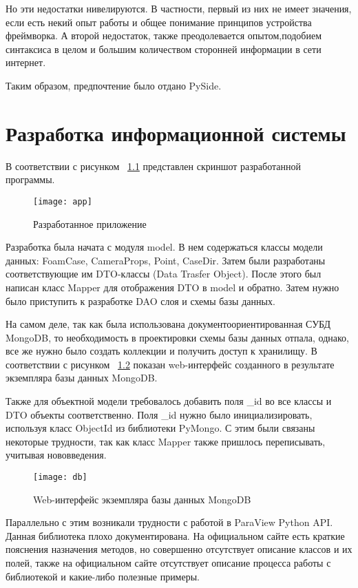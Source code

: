 \documentclass[14pt]{extreport}
\begin{document}
Но эти недостатки нивелируются. В частности, первый из них не имеет значения, если есть некий опыт работы и общее понимание принципов устройства фреймворка. А второй недостаток, также преодолевается опытом,подобием синтаксиса в целом и большим количеством сторонней информации в сети интернет.

Таким образом, предпочтение было отдано PySide. 

\chapter{Разработка информационной системы}
В соответствии с рисунком ~\ref{fig15} представлен скриншот разработанной программы. 
\begin{figure}[H]
	\centerline{\texttt{[image: app]}}
	\caption{Разработанное приложение}
	\label{fig15}
\end{figure}

Разработка была начата с модуля model. В нем содержаться классы модели данных: FoamCase, CameraProps, Point, CaseDir. Затем были разработаны соответствующие им DTO-классы (Data Trasfer Object). После этого был написан класс Mapper для отображения DTO в model и обратно. Затем нужно было приступить к разработке DAO слоя и схемы базы данных. 

На самом деле, так как была использована документоориентированная СУБД MongoDB, то необходимость в проектировки схемы базы данных отпала, однако, все же нужно было создать коллекции и получить доступ к хранилищу. В соответствии с рисунком ~\ref{figdb} показан web-интерфейс созданного в результате экземпляра базы данных MongoDB. 

Также для объектной модели требовалось добавить поля \_id во все классы и DTO объекты соответственно. Поля \_id нужно было инициализировать, используя класс ObjectId из библиотеки PyMongo. С этим были связаны некоторые трудности, так как класс Mapper также пришлось переписывать, учитывая нововведения.


\begin{figure}[H]
	\centerline{\texttt{[image: db]}}
	\caption{Web-интерфейс экземпляра базы данных MongoDB}
	\label{figdb}
\end{figure}

Параллельно с этим возникали трудности с работой в ParaView Python API. Данная библиотека плохо документирована. На официальном сайте есть краткие пояснения назначения методов, но совершенно отсутствует описание классов и их полей, также на официальном сайте отсутствует описание процесса работы с библиотекой и какие-либо полезные примеры.
\end{document}
